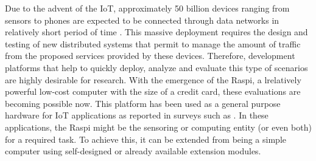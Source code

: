 %

Due to the advent of the \ac{IoT}, approximately 50 billion devices
ranging from sensors to phones are expected to be connected through
data networks in relatively short period of time \cite{cisco2011forecast}.
This massive deployment requires the design and testing of new
distributed systems that permit to manage the amount of traffic
from the proposed services provided by these devices. Therefore,
development platforms that help to quickly deploy, analyze and
evaluate this type of scenarios are highly desirable for research.
With the emergence of the \ac{Raspi}, a lrelatively powerful low-cost
computer with the size of a credit card, these evaluations are becoming
possible now. This platform has been used as a general purpose hardware
for \ac{IoT} applications as reported in surveys such as
\cite{alfuqaha2015iot}. In these applications, the
\ac{Raspi} might be the sensoring or computing entity (or even both) for
a required task. To achieve this, it can be extended from being a
simple computer using self-designed or already available extension modules.


